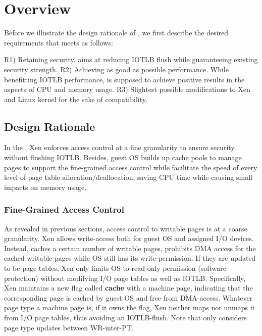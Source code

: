 \section{\name Overview} \label{sec:overview}
Before we illustrate the design rationale of \name, we first describe the desired requirements that \name meets as follows:

R1) Retaining security. \name aims at reducing IOTLB flush while guaranteeing existing security strength.
R2) Achieving as good as possible performance. While benefitting IOTLB performance, \name is supposed to achieve positive results in the aspects of CPU and memory usage.
R3) Slightest possible modifications to Xen and Linux kernel for the sake of compatibility.

\subsection{Design Rationale}
In the \name, Xen enforces access control at a fine granularity to ensure security without flushing IOTLB. Besides, guest OS builds up cache pools to manage pages to support the fine-grained access control while facilitate the speed of every level of page table allocation/deallocation, saving CPU time while causing small impacts on memory usage.

\subsubsection{Fine-Grained Access Control}
As revealed in previous sections, access control to writable pages is at a coarse granularity. Xen allows write-access both for guest OS and assigned I/O devices. Instead, \name caches a certain number of writable pages, prohibits DMA access for the cached writable pages while OS still has its write-permission. If they are updated to be page tables, Xen only limits OS to read-only permission (software protection) without modifying I/O page tables as well as IOTLB. Specifically, Xen maintains a new flag called \textbf{cache} with a machine page, indicating that the corresponding page is cached by guest OS and free from DMA-access. Whatever page type a machine page is, if it owns the flag, Xen neither maps nor unmaps it from I/O page tables, thus avoiding an IOTLB-flush. Note that \name only considers page type updates between WR-inter-PT.

